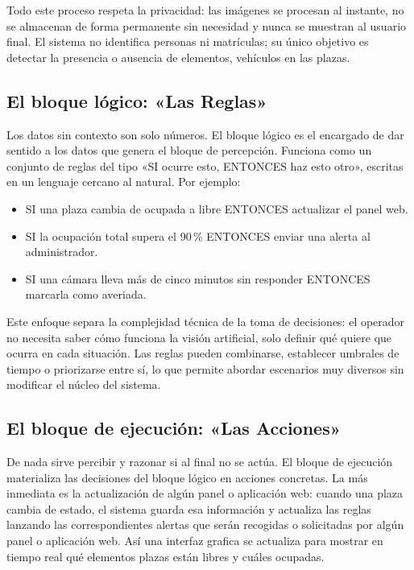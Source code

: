\documentclass[12pt,a4paper]{article}
\begin{document}
Todo este proceso respeta la privacidad: las imágenes se procesan al instante, no se almacenan de forma permanente sin necesidad y nunca se muestran al usuario final. El sistema no identifica personas ni matrículas; su único objetivo es detectar la presencia o ausencia de elementos, vehículos en las plazas.

\subsection{El bloque lógico: «Las Reglas»}

Los datos sin contexto son solo números. El bloque lógico es el encargado de dar sentido a los datos que genera el bloque de percepción. Funciona como un conjunto de reglas del tipo «SI ocurre esto, ENTONCES haz esto otro», escritas en un lenguaje cercano al natural. Por ejemplo:

\begin{itemize}
	\item SI una plaza cambia de ocupada a libre ENTONCES actualizar el panel web.
	\item SI la ocupación total supera el 90\,\% ENTONCES enviar una alerta al administrador.
	\item SI una cámara lleva más de cinco minutos sin responder ENTONCES marcarla como averiada.
\end{itemize}

Este enfoque separa la complejidad técnica de la toma de decisiones: el operador no necesita saber cómo funciona la visión artificial, solo definir qué quiere que ocurra en cada situación. Las reglas pueden combinarse, establecer umbrales de tiempo o priorizarse entre sí, lo que permite abordar escenarios muy diversos sin modificar el núcleo del sistema.

\subsection{El bloque de ejecución: «Las Acciones»}

De nada sirve percibir y razonar si al final no se actúa. El bloque de ejecución materializa las decisiones del bloque lógico en acciones concretas. La más inmediata es la actualización de algún panel o aplicación web: cuando una plaza cambia de estado, el sistema guarda esa información y actualiza las reglas lanzando las correspondientes alertas que serán recogidas o solicitadas por algún panel o aplicación web. Así una interfaz grafica se actualiza para mostrar en tiempo real qué elementos plazas están libres y cuáles ocupadas.
\end{document}

